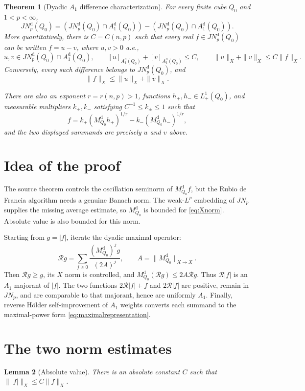 \documentclass[11pt]{article}
\newtheorem{theorem}{Theorem}
\newtheorem{lemma}[theorem]{Lemma}
\newcommand{\M}{M^{\mathrm d}_{Q_0}}
\newcommand{\JN}{JN^{\mathrm d}_p(Q_0)}
\newcommand{\Aone}{A^{\mathrm d}_1(Q_0)}
\newcommand{\Rop}{\mathcal R}
\begin{document}
\begin{theorem}[Dyadic $A_1$ difference characterization]\label{thm:main}
For every finite cube $Q_0$ and $1<p<\infty$,
\begin{equation}\label{eq:characterization}
 \JN=(\JN\cap\Aone)-(\JN\cap\Aone).
\end{equation}
More quantitatively, there is $C=C(n,p)$ such that every real
$f\in\JN$ can be written $f=u-v$, where $u,v>0$ a.e.,
\[
 u,v\in\JN\cap\Aone,
 \qquad [u]_{\Aone}+[v]_{\Aone}\leq C,
 \qquad \|u\|_X+\|v\|_X\leq C\|f\|_X.
\]
Conversely, every such difference belongs to $\JN$, and
\[
 \|f\|_X\leq \|u\|_X+\|v\|_X.
\]

There are also an exponent $r=r(n,p)>1$, functions
$h_+,h_-\in L^1_+(Q_0)$, and measurable multipliers $k_+,k_-$ satisfying
$C^{-1}\leq k_\pm\leq1$ such that
\begin{equation}\label{eq:maximalrepresentation}
 f=k_+(\M h_+)^{1/r}-k_-(\M h_-)^{1/r},
\end{equation}
and the two displayed summands are precisely $u$ and $v$ above.
\end{theorem}

\section{Idea of the proof}

The source theorem controls the oscillation seminorm of $\M f$, but the
Rubio de Francia algorithm needs a genuine Banach norm.  The weak-$L^p$
embedding of $JN_p$ supplies the missing average estimate, so $\M$ is bounded
for \eqref{eq:Xnorm}.  Absolute value is also bounded for this norm.

Starting from $g=|f|$, iterate the dyadic maximal operator:
\[
 \Rop g=\sum_{j\geq0}\frac{(\M)^j g}{(2A)^j},
 \qquad A=\|\M\|_{X\to X}.
\]
Then $\Rop g\geq g$, its $X$ norm is controlled, and
$\M(\Rop g)\leq2A\Rop g$.  Thus $\Rop|f|$ is an $A_1$ majorant of $|f|$.
The two functions $2\Rop|f|+f$ and $2\Rop|f|$ are positive, remain in
$JN_p$, and are comparable to that majorant, hence are uniformly $A_1$.
Finally, reverse H\"older self-improvement of $A_1$ weights converts each
summand to the maximal-power form \eqref{eq:maximalrepresentation}.

\section{The two norm estimates}

\begin{lemma}[Absolute value]\label{lem:absolute}
There is an absolute constant $C$ such that
$\||f|\|_X\leq C\|f\|_X$.
\end{lemma}
\end{document}
